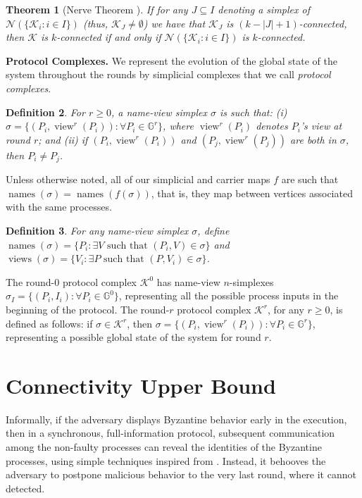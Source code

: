 \documentclass[11pt]{article}
\newcommand{\cK}{\ensuremath{\mathcal{K}}}
\newcommand{\cN}{\ensuremath{\mathcal{N}}}
\newcommand{\bbG}{\ensuremath{\mathbb{G}}}
\DeclareMathOperator{\names}{names}\DeclareMathOperator{\name}{name}\DeclareMathOperator{\sgn}{sgn}
\DeclareMathOperator{\views}{views}
\DeclareMathOperator{\view}{view}
\newtheorem{theorem}{Theorem}[section]
\newtheorem{definition}[theorem]{Definition}
\newcommand{\set}[1]{\{#1\}}
\begin{document}
\begin{theorem}[Nerve Theorem \cite{Kozlov07,Bjorner1995}]
\label{theorem-nerve}
If for any $J \subseteq I$ denoting a simplex of $\cN(\set{\cK_i: i \in I})$
(thus, $\cK_J \ne \emptyset$)
we have that $\cK_J$ is $(k - |J| + 1)$-connected,
then $\cK$ is $k$-connected if and only if $\cN(\set{\cK_i: i \in I})$ is $k$-connected.
\end{theorem}



\textbf{Protocol Complexes.} 
We represent the evolution of the global state of the system throughout the rounds
by simplicial complexes that we call \emph{protocol complexes}.


\begin{definition}
\label{definition-labeled}
For $r \ge 0$,
a \emph{name-view} simplex $\sigma$ is such that:
(i) $\sigma = \set{(P_i,\view^r(P_i)): \forall P_i \in \bbG^r}$,
where $\view^r(P_i)$ denotes $P_i$'s view at round $r$;
and (ii) if $(P_i,\view^r(P_i))$ and $(P_j,\view^r(P_j))$ are both in $\sigma$,
then $P_i \ne P_j$.
\end{definition}

Unless otherwise noted, all of our simplicial and carrier maps $f$ are such that $\names(\sigma) = \names(f(\sigma))$, that is, they map between vertices associated with the same processes.

\begin{definition}
For any name-view simplex $\sigma$, define
$\names(\sigma) = \set{P_i: \exists V \textrm{ such that } (P_i,V) \in \sigma}$
and
$\views(\sigma) = \set{V_i: \exists P \textrm{ such that } (P,V_i) \in \sigma}$.
\end{definition}

The round-$0$ protocol complex $\cK^0$ has
name-view $n$-simplexes $\sigma_I = \set{(P_i,I_i): \forall P_i \in \bbG^0}$,
representing all the possible process inputs in the beginning of the protocol.
The round-$r$ protocol complex $\cK^r$,
for any $r \ge 0$,
is defined as follows:
if $\sigma \in \cK^r$,
then $\sigma = \set{(P_i,\view^r(P_i)): \forall P_i \in \bbG^r}$,
representing a possible global state of the system for round $r$.

\section{Connectivity Upper Bound}
\label{Sec-ConnectivityUpperBound}
Informally, if the adversary displays Byzantine behavior early in the execution,
then in a synchronous, full-information protocol,
subsequent communication among the non-faulty processes can reveal
the identities of the Byzantine processes,
using simple techniques inspired from \cite{BazziNeiger01,Bracha,SriTouRB}.
Instead, it behooves the adversary to postpone malicious behavior to
the very last round, where it cannot detected.
\end{document}

